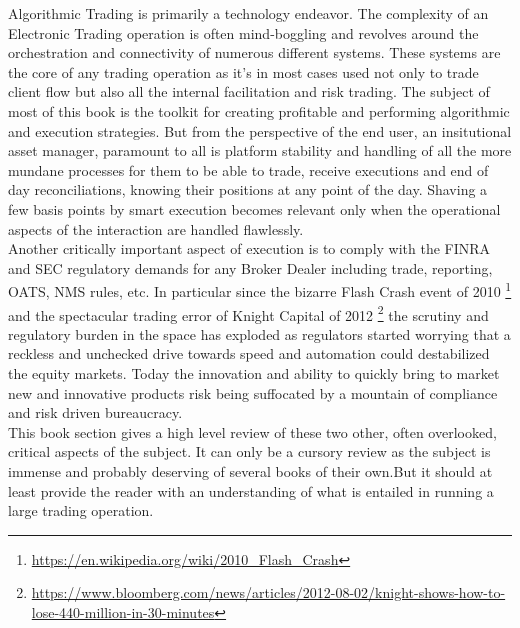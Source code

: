 
Algorithmic Trading is primarily a technology endeavor. The complexity of an Electronic Trading operation is often mind-boggling and revolves around the orchestration and connectivity of numerous different systems. These systems are the core of any trading operation as it's in most cases used not only to trade client flow but also all the internal facilitation and risk trading. The subject of most of this book is the toolkit for creating profitable and performing algorithmic and execution strategies. But from the perspective of the end user, an insitutional asset manager, paramount to all is platform stability and handling of all the more mundane processes for them to be able to trade, receive executions and end of day reconciliations, knowing their positions at any point of the day. Shaving a few basis points by smart execution becomes relevant only when the operational aspects of the interaction are handled flawlessly.\\

Another critically important aspect of execution is to comply with the FINRA and SEC regulatory demands for any Broker Dealer including trade, reporting, OATS, NMS rules, etc. In particular since the bizarre Flash Crash event of 2010 \footnote{\url{https://en.wikipedia.org/wiki/2010_Flash_Crash}} and the spectacular trading error of Knight Capital of 2012 \footnote{\url{https://www.bloomberg.com/news/articles/2012-08-02/knight-shows-how-to-lose-440-million-in-30-minutes}} the scrutiny and regulatory burden in the space has exploded as regulators started worrying that a reckless and unchecked drive towards speed and automation could destabilized the equity markets. Today the innovation and ability to quickly bring to market new and innovative products risk being suffocated by a mountain of compliance and risk driven bureaucracy.\\

This book section gives a high level review of these two other, often overlooked, critical aspects of the subject. It can only be a cursory review as the subject is immense and probably deserving of several books of their own.But it should at least provide the reader with an understanding of what is entailed in running a large trading operation.

 

